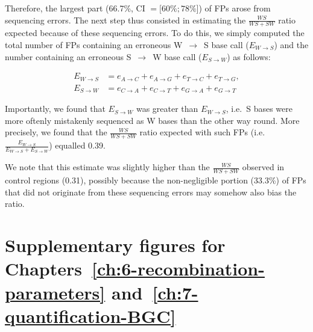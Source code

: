 Therefore, the largest part (66.7\%, CI $= [60\%; 78\%$]) of FPs arose from sequencing errors.
The next step thus consisted in estimating the $\frac{WS}{WS+SW}$ ratio expected because of these sequencing errors.
To do this, we simply computed the total number of FPs containing an erroneous W~$\rightarrow$~S base call ($E_{W\rightarrow S}$) and the number containing an erroneous S~$\rightarrow$~W base call ($E_{S\rightarrow W}$) as follows:

\begin{align}
        E_{W\rightarrow S}&= e_{A\rightarrow C} + e_{A\rightarrow G} + e_{T\rightarrow C} + e_{T\rightarrow G}, \\
        E_{S\rightarrow W}&= e_{C\rightarrow A} + e_{C\rightarrow T} + e_{G\rightarrow A} + e_{G\rightarrow T}
\end{align}

Importantly, we found that $E_{S\rightarrow W}$ was greater than $E_{W\rightarrow S}$, i.e.\ S bases were more oftenly mistakenly sequenced as W bases than the other way round.
More precisely, we found that the $\frac{WS}{WS+SW}$ ratio expected with such FPs (i.e.\ $\frac{E_{W\rightarrow S}}{E_{W\rightarrow S} + E_{S\rightarrow W}}$) equalled 0.39.

We note that this estimate was slightly higher than the $\frac{WS}{WS+SW}$ observed in control regions (0.31), possibly because the non-negligible portion (33.3\%) of FPs that did not originate from these sequencing errors may somehow also bias the ratio.









%
%



\hypersetup{linkcolor=titlepagecolorsection}
\section{Supplementary figures for Chapters~\ref{ch:6-recombination-parameters} and~\ref{ch:7-quantification-BGC}}
\hypersetup{linkcolor=black}

